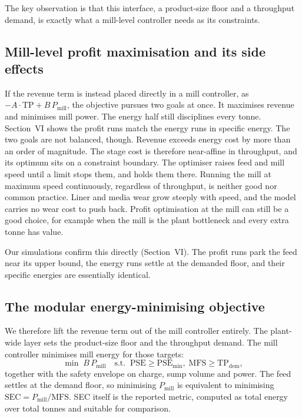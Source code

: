\documentclass[conference]{IEEEtran}
\begin{document}
The key observation is that this interface, a product-size floor and a
throughput demand, is exactly what a mill-level controller needs as its
constraints.

\subsection{Mill-level profit maximisation and its side effects}

If the revenue term is instead placed directly in a mill controller, as
$-A\cdot\mathrm{TP} + B\,P_{\mathrm{mill}}$, the objective pursues two
goals at once. It maximises revenue and minimises mill power. The energy
half still disciplines every tonne. Section~VI shows the profit runs match
the energy runs in specific energy. The two goals are not balanced,
though. Revenue exceeds energy cost by more than an order of magnitude. The
stage cost is therefore near-affine in throughput, and its optimum sits on
a constraint boundary. The optimiser raises feed and mill speed until a
limit stops them, and holds them there. Running the mill at maximum speed
continuously, regardless of throughput, is neither good nor common
practice. Liner and media wear grow steeply with speed, and the model
carries no wear cost to push back. Profit optimisation at the mill can
still be a good choice, for example when the mill is the plant bottleneck
and every extra tonne has value.

Our simulations confirm this directly (Section~VI). The profit runs park
the feed near its upper bound, the energy runs settle at the demanded
floor, and their specific energies are essentially identical.

\subsection{The modular energy-minimising objective}

We therefore lift the revenue term out of the mill controller entirely.
The plant-wide layer sets the product-size floor and the throughput
demand. The mill controller minimises mill energy for those targets:
\begin{equation}
\min \; B\,P_{\mathrm{mill}}
\quad \text{s.t.}\;\; \mathrm{PSE}\ge \mathrm{PSE}_{\min},\;
\mathrm{MFS}\ge \mathrm{TP}_{\mathrm{dem}},
\label{eq:sec}
\end{equation}
together with the safety envelope on charge, sump volume and power. The
feed settles at the demand floor, so minimising
$P_{\mathrm{mill}}$ is equivalent to minimising
$\mathrm{SEC}=P_{\mathrm{mill}}/\mathrm{MFS}$. SEC itself is the
reported metric, computed as total energy over total tonnes and suitable
for comparison.
\end{document}
